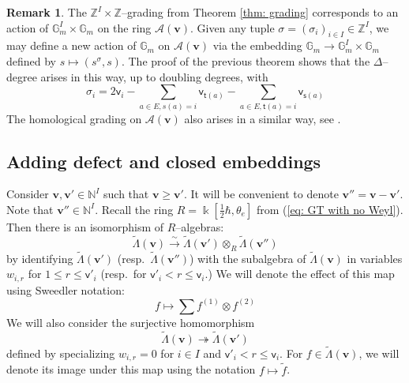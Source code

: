 \documentclass[11pt,reqno]{amsart}
\renewcommand{\mathbf}{\mathbold}
\numberwithin{equation}{section}
\theoremstyle{definition}
\newtheorem{Remark}[equation]{Remark}
\newcommand{\cA}{\mathcal{A}}
\newcommand{\bv}{\mathbf{v}}
\newcommand{\GG}{\mathbb{G}}
\newcommand{\NN}{\mathbb{N}}
\newcommand{\ZZ}{\mathbb{Z}}
\newcommand{\kk}{\Bbbk}
\renewcommand{\bv}{\mathbf{v}} %
\newcommand{\sv}{\mathsf{v}}
\newcommand{\source}{\mathsf{s}}
\newcommand{\target}{\mathsf{t}}
\newcommand{\vertexset}{I}
\newcommand{\arrowset}{E}
\newcommand{\tGT}{\widetilde{\Lambda}}
\newcommand{\base}{R}
\newcommand{\qzast}{\cA}
\begin{document}
\begin{Remark}
The $\ZZ^\vertexset \times \ZZ$--grading from Theorem \ref{thm: grading} corresponds to an action of $\GG_m^{\vertexset}\times \GG_m$ on the ring $\qzast(\bv)$.  Given any tuple $\sigma = (\sigma_i)_{i \in \vertexset} \in \ZZ^{\vertexset}$, we may define a new action of $\GG_m$ on $\qzast(\bv)$ via the embedding $\GG_m \rightarrow \GG_m^{\vertexset}\times \GG_m$ defined by $ s \mapsto (s^{\sigma}, s)$. The proof of the previous theorem shows that the $\Delta$--degree arises in this way, up to doubling degrees, with
$$
\sigma_i = 2 \sv_i - \sum_{a \in \arrowset, s(a) = i} \sv_{\target(a)} - \sum_{a \in \arrowset, \target(a) = i} \sv_{\source(a)}
$$ 
The homological grading on $\qzast(\bv)$ also arises in a similar way, see \cite[Remark 2.8(2)]{BFN1}.
\end{Remark}



\subsection{Adding defect and closed embeddings}
\label{ssec:adce}

Consider $\bv, \bv' \in \NN^\vertexset$ such that $\bv \geq \bv'$.  It will be convenient to denote $\bv'' = \bv - \bv'$.  Note that $\bv'' \in \NN^\vertexset$. Recall the ring $\base = \kk[\tfrac{1}{2}\hbar, \theta_e]$ from  (\ref{eq: GT with no Weyl}). Then there is an isomorphism of $\base$--algebras:
\begin{equation}
\label{eq:polyringstensor}
\tGT(\bv) \stackrel{\sim}{\longrightarrow} \tGT(\bv') \otimes_{\base} \tGT(\bv'')
\end{equation}
by identifying $\tGT(\bv')$ (resp.~$\tGT(\bv'')$) with the subalgebra of $\tGT(\bv)$ in variables $w_{i,r}$ for $1\leq r \leq \sv'_i$ (resp.~for $\sv'_i < r \leq \sv_i$.)  We will denote the effect of this map using Sweedler notation:
\begin{equation}
f \longmapsto \sum f^{(1)} \otimes f^{(2)}
\end{equation}
We will also consider the surjective homomorphism 
\begin{equation}
    \label{eq: directed system of symmetric polynomials}  
    \tGT(\bv) \twoheadrightarrow \tGT(\bv')
\end{equation}
defined by specializing $w_{i,r} = 0$ for $i\in I$ and $\sv'_i < r \leq \sv_i$. For $f \in \tGT(\bv)$, we will denote its image under this map using the notation  $f \longmapsto \widetilde{f}$.
\end{document}
